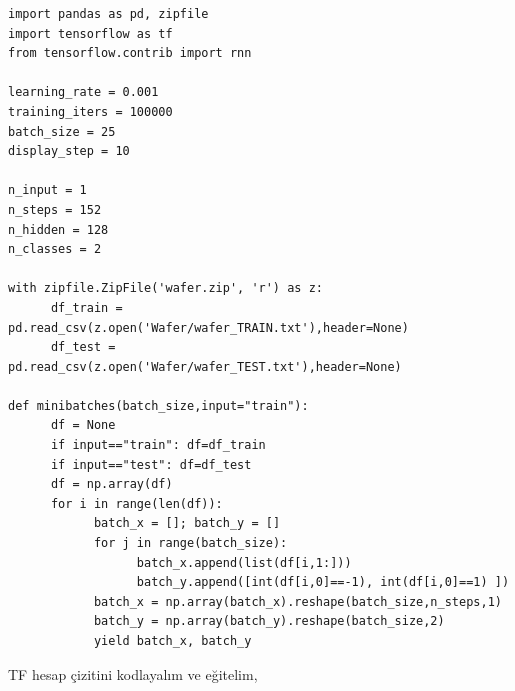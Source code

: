 \documentclass[12pt,fleqn]{article}\usepackage{../../common}
\begin{document}
\begin{verbatim}
import pandas as pd, zipfile
import tensorflow as tf
from tensorflow.contrib import rnn

learning_rate = 0.001
training_iters = 100000
batch_size = 25
display_step = 10

n_input = 1 
n_steps = 152 
n_hidden = 128 
n_classes = 2

with zipfile.ZipFile('wafer.zip', 'r') as z:
      df_train =  pd.read_csv(z.open('Wafer/wafer_TRAIN.txt'),header=None)
      df_test =  pd.read_csv(z.open('Wafer/wafer_TEST.txt'),header=None)

def minibatches(batch_size,input="train"):
      df = None
      if input=="train": df=df_train
      if input=="test": df=df_test
      df = np.array(df)
      for i in range(len(df)):
            batch_x = []; batch_y = []
            for j in range(batch_size):
                  batch_x.append(list(df[i,1:]))
                  batch_y.append([int(df[i,0]==-1), int(df[i,0]==1) ])
            batch_x = np.array(batch_x).reshape(batch_size,n_steps,1)
            batch_y = np.array(batch_y).reshape(batch_size,2)
            yield batch_x, batch_y                  

\end{verbatim}

TF hesap çizitini kodlayalım ve eğitelim,
\end{document}
